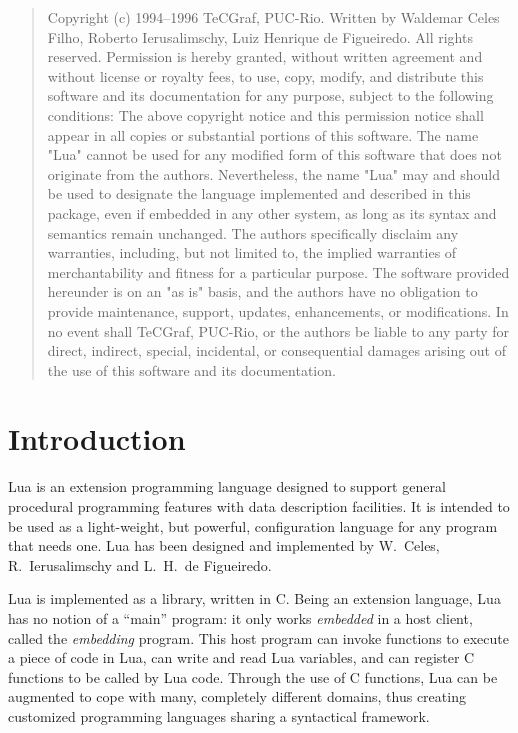 \vfill
\begin{quotation}
\noindent
\footnotesize
Copyright (c) 1994--1996 TeCGraf, PUC-Rio.  Written by Waldemar Celes Filho,
Roberto Ierusalimschy, Luiz Henrique de Figueiredo.  All rights reserved.
%
Permission is hereby granted, without written agreement and without license or
royalty fees, to use, copy, modify, and distribute this software and its
documentation for any purpose, subject to the following conditions:
%
The above copyright notice and this permission notice shall appear in all
copies or substantial portions of this software.
%
The name "Lua" cannot be used for any modified form of this software that does
not originate from the authors.  Nevertheless, the name "Lua" may and should be
used to designate the language implemented and described in this package,
even if embedded in any other system, as long as its syntax and semantics
remain unchanged.
%
The authors specifically disclaim any warranties, including, but not limited
to, the implied warranties of merchantability and fitness for a particular
purpose.  The software provided hereunder is on an "as is" basis, and the
authors have no obligation to provide maintenance, support, updates,
enhancements, or modifications.  In no event shall TeCGraf, PUC-Rio, or the
authors be liable to any party for direct, indirect, special, incidental, or
consequential damages arising out of the use of this software and its
documentation.
\end{quotation}
\vfill

\newpage

\tableofcontents

\newpage
\setcounter{page}{1}
\pagestyle{plain}


\section{Introduction}

Lua is an extension programming language designed to support
general procedural programming features with data description
facilities.
It is intended to be used as a
light-weight, but powerful, configuration language for any
program that needs one.
Lua has been designed and implemented by
W.~Celes,
R.~Ierusalimschy and
L.~H.~de Figueiredo.

Lua is implemented as a library, written in C.
Being an extension language, Lua has no notion of a ``main'' program:
it only works {\em embedded\/} in a host client,
called the {\em embedding\/} program.
This host program can invoke functions to execute a piece of
code in Lua, can write and read Lua variables,
and can register C functions to be called by Lua code.
Through the use of C functions, Lua can be augmented to cope with
many, completely different domains,
thus creating customized programming languages sharing a syntactical framework.

